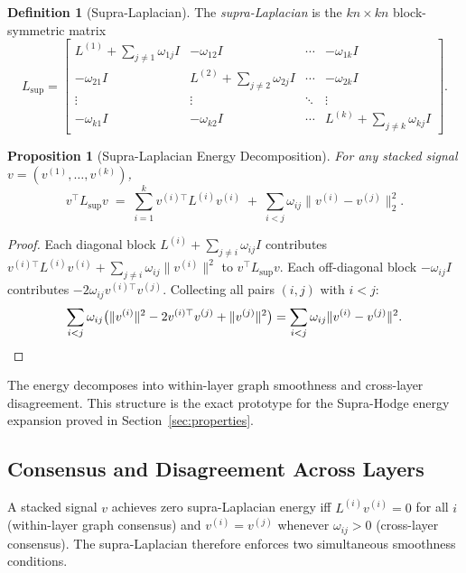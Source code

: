 \documentclass[11pt]{article}
\newtheorem{proposition}[theorem]{Proposition}
\theoremstyle{definition}
\newtheorem{definition}[theorem]{Definition}
\theoremstyle{remark}
\newcommand{\Lsup}{L_{\mathrm{sup}}}
\begin{document}
\begin{definition}[Supra-Laplacian]
The \emph{supra-Laplacian} is the $kn\times kn$ block-symmetric matrix
\begin{equation}
  \label{eq:supra}
  \Lsup =
  \begin{bmatrix}
    L^{(1)} + \textstyle\sum_{j\neq 1}\omega_{1j}I & -\omega_{12}I & \cdots & -\omega_{1k}I\\
    -\omega_{21}I & L^{(2)} + \textstyle\sum_{j\neq 2}\omega_{2j}I & \cdots & -\omega_{2k}I\\
    \vdots & \vdots & \ddots & \vdots\\
    -\omega_{k1}I & -\omega_{k2}I & \cdots & L^{(k)} + \textstyle\sum_{j\neq k}\omega_{kj}I
  \end{bmatrix}.
\end{equation}
\end{definition}

\begin{proposition}[Supra-Laplacian Energy Decomposition]
\label{prop:supra_energy}
For any stacked signal $v=(v^{(1)},\dots,v^{(k)})$,
\[
  v^\top \Lsup v
  \;=\; \sum_{i=1}^k v^{(i)\top} L^{(i)} v^{(i)}
  \;+\; \sum_{i<j}\omega_{ij}\|v^{(i)} - v^{(j)}\|_2^2.
\]
\end{proposition}

\begin{proof}
Each diagonal block $L^{(i)}+\sum_{j\neq i}\omega_{ij}I$ contributes
$v^{(i)\top}L^{(i)}v^{(i)} + \sum_{j\neq i}\omega_{ij}\|v^{(i)}\|^2$ to
$v^\top\Lsup v$. Each off-diagonal block $-\omega_{ij}I$ contributes
$-2\omega_{ij}v^{(i)\top}v^{(j)}$. Collecting all pairs $(i,j)$ with $i<j$:
\[
  \sum_{i<j}\omega_{ij}\bigl(\|v^{(i)}\|^2 - 2v^{(i)\top}v^{(j)}
  + \|v^{(j)}\|^2\bigr)
  = \sum_{i<j}\omega_{ij}\|v^{(i)}-v^{(j)}\|^2. \qedhere
\]
\end{proof}

The energy decomposes into within-layer graph smoothness and cross-layer
disagreement. This structure is the exact prototype for the Supra-Hodge energy
expansion proved in Section~\ref{sec:properties}.

\subsection{Consensus and Disagreement Across Layers}

A stacked signal $v$ achieves zero supra-Laplacian energy iff $L^{(i)}v^{(i)}=0$
for all $i$ (within-layer graph consensus) and $v^{(i)}=v^{(j)}$ whenever
$\omega_{ij}>0$ (cross-layer consensus). The supra-Laplacian therefore enforces
two simultaneous smoothness conditions.
\end{document}
